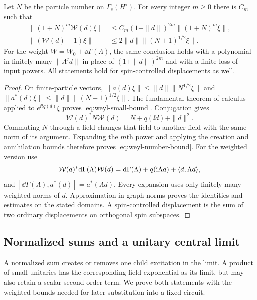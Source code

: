 \begin{lemma}\label{lem:weyl-bounds}
Let $N$ be the particle number on $\Gamma_s(H^\circ)$.  For every
integer $m\geq0$ there is $C_m$ such that
\begin{align}
 \|(1+N)^m\mathcal W(d)\xi\|
 &\leq C_m(1+\|d\|)^{2m}\|(1+N)^m\xi\|,
       \label{eq:weyl-number-bound}\\
 \|(\mathcal W(d)-1)\xi\|
 &\leq2\|d\|\|(N+1)^{1/2}\xi\|.
       \label{eq:weyl-small-bound}
\end{align}
For the weight $W=W_0+\dd\Gamma(\Lambda)$, the same conclusion
holds with a polynomial in finitely many $\|\Lambda^j d\|$ in
place of $(1+\|d\|)^{2m}$ and with a finite loss of input powers.
All statements hold for spin-controlled displacements as well.
\end{lemma}

\begin{proof}
On finite-particle vectors,
$\|a(d)\xi\|\leq\|d\|\|N^{1/2}\xi\|$ and
$\|a^*(d)\xi\|\leq\|d\|\|(N+1)^{1/2}\xi\|$.
The fundamental theorem of calculus applied to
$e^{\ii t q(d)}\xi$ proves \eqref{eq:weyl-small-bound}.
Conjugation gives
\[
 \mathcal W(d)^*N\mathcal W(d)=N+q(\ii d)+\|d\|^2.
\]
Commuting $N$ through a field changes that field to another field
with the same norm of its argument.  Expanding the $m$th power
and applying the creation and annihilation bounds therefore proves
\eqref{eq:weyl-number-bound}.  For the weighted version use
\[
 \mathcal W(d)^*\mathrm d\Gamma(\Lambda)\mathcal W(d)
 =\mathrm d\Gamma(\Lambda)+q(\mathrm i\Lambda d)
       +\langle d,\Lambda d\rangle,
\]
and $[\dd\Gamma(\Lambda),a^*(d)]=a^*(\Lambda d)$.
Every expansion uses only finitely many weighted norms of $d$.
Approximation in graph norms proves the identities and estimates
on the stated domains.  A spin-controlled displacement is the
sum of two ordinary displacements on orthogonal spin subspaces.
\end{proof}

\subsection{Normalized sums and a unitary central limit}
\label{sec:unitary-clt}

A normalized sum creates or removes one child excitation in the
limit.  A product of small unitaries has the corresponding field
exponential as its limit, but may also retain a scalar second-order
term.  We prove both statements with the weighted bounds needed for
later substitution into a fixed circuit.

